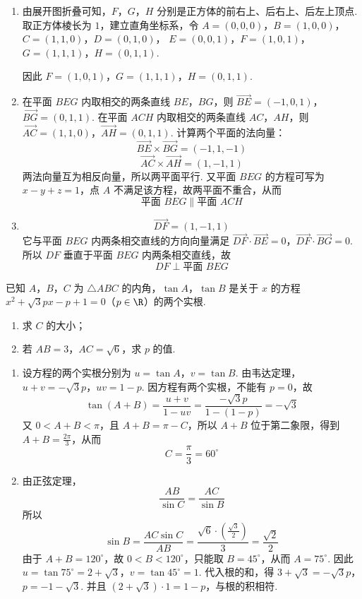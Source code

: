 \begin{solution}
\begin{enumerate}
\item
由展开图折叠可知，\(F\)，\(G\)，\(H\) 分别是正方体的前右上、后右上、后左上顶点. 取正方体棱长为 \(1\)，建立直角坐标系，令
\(A=(0,0,0)\)，\(B=(1,0,0)\)，\(C=(1,1,0)\)，\(D=(0,1,0)\)，
\(E=(0,0,1)\)，\(F=(1,0,1)\)，\(G=(1,1,1)\)，\(H=(0,1,1)\).

因此 \(F=(1,0,1)\)，\(G=(1,1,1)\)，\(H=(0,1,1)\).

\item 在平面 \(BEG\) 内取相交的两条直线 \(BE\)，\(BG\)，则
\(\overrightarrow{BE}=(-1,0,1)\)，\(\overrightarrow{BG}=(0,1,1)\).
在平面 \(ACH\) 内取相交的两条直线 \(AC\)，\(AH\)，则
\(\overrightarrow{AC}=(1,1,0)\)，\(\overrightarrow{AH}=(0,1,1)\).
计算两个平面的法向量：
\[
\overrightarrow{BE}\times\overrightarrow{BG}=(-1,1,-1)
\]
\[
\overrightarrow{AC}\times\overrightarrow{AH}=(1,-1,1)
\]
两法向量互为相反向量，所以两平面平行. 又平面 \(BEG\) 的方程可写为 \(x-y+z=1\)，点 \(A\) 不满足该方程，故两平面不重合，从而
\[
\text{平面 }BEG\parallel\text{平面 }ACH
\]

\item
\[
\overrightarrow{DF}=(1,-1,1)
\]
它与平面 \(BEG\) 内两条相交直线的方向向量满足
\(\overrightarrow{DF}\cdot\overrightarrow{BE}=0\)，\(\overrightarrow{DF}\cdot\overrightarrow{BG}=0\).
所以 \(DF\) 垂直于平面 \(BEG\) 内两条相交直线，故
\[
DF\perp\text{平面 }BEG
\]
\end{enumerate}
\end{solution}

\begin{problem}
已知 \(A\)，\(B\)，\(C\) 为 \(\triangle ABC\) 的内角，\(\tan A\)，\(\tan B\) 是关于 \(x\) 的方程 \(x^{2} + \sqrt{3}px - p + 1 = 0\)（\(p \in \R\)）的两个实根.

\begin{enumerate}
\item 求 \(C\) 的大小；
\item 若 \(AB = 3\)，\(AC = \sqrt{6}\)，求 \(p\) 的值.
\end{enumerate}
\end{problem}

\begin{solution}
\begin{enumerate}
\item
设方程的两个实根分别为 \(u=\tan A\)，\(v=\tan B\). 由韦达定理，
\(u+v=-\sqrt3p\)，\(uv=1-p\).
因方程有两个实根，不能有 \(p=0\)，故
\[
\tan(A+B)=\frac{u+v}{1-uv}
=\frac{-\sqrt3p}{1-(1-p)}=-\sqrt3
\]
又 \(0<A+B<\pi\)，且 \(A+B=\pi-C\)，所以 \(A+B\) 位于第二象限，得到 \(A+B=\frac{2\pi}{3}\)，从而
\[
C=\frac{\pi}{3}=60^{\circ}
\]

\item 由正弦定理，
\[
\frac{AB}{\sin C}=\frac{AC}{\sin B}
\]
所以
\[
\sin B=\frac{AC\sin C}{AB}
=\frac{\sqrt6\cdot(\frac{\sqrt3}{2})}3=\frac{\sqrt2}{2}
\]
由于 \(A+B=120^{\circ}\)，故 \(0<B<120^{\circ}\)，只能取 \(B=45^{\circ}\)，从而 \(A=75^{\circ}\). 因此
\(u=\tan75^{\circ}=2+\sqrt3\)，\(v=\tan45^{\circ}=1\).
代入根的和，得
\(3+\sqrt3=-\sqrt3p\)，\(p=-1-\sqrt3\).
并且 \((2+\sqrt3)\cdot1=1-p\)，与根的积相符.
\end{enumerate}
\end{solution}


